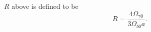 \documentclass[aps,prl,twocolumn,groupedaddress,nofootinbib]{revtex4-2}
\begin{document}
$R$ above is defined to be
\begin{equation*}
    R = \frac{4\Omega_{\gamma 0}}{3\Omega_{b 0} a}.
\end{equation*}





%


\end{document}
